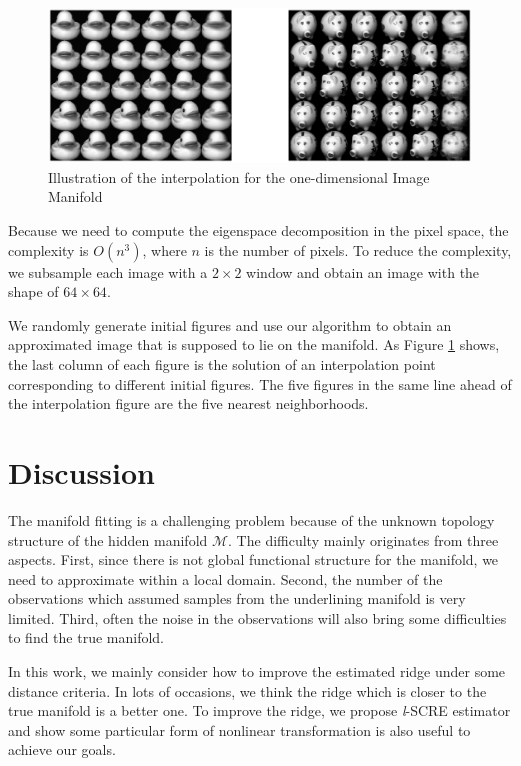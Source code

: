 \documentclass[aos,preprint]{imsart}
\theoremstyle{remark}
\begin{document}
\begin{figure}[h] %
   \includegraphics[width=\linewidth]{duck_pig.eps} 
   \caption{Illustration of the interpolation for the one-dimensional Image Manifold}
   \label{fig:interpolation demo}
\end{figure}

Because we need to compute the eigenspace decomposition in the pixel space, the complexity is $O(n^3)$, where $n$ is the number of pixels. To reduce the complexity, we subsample each image with a $2\times 2$ window and obtain an image with the shape of $64\times 64$.

We randomly generate initial figures and use our algorithm to obtain an approximated image that is supposed to lie on the manifold. As Figure \ref{fig:interpolation demo} shows, the last column of each figure is the solution of an interpolation point corresponding to different initial figures. The five figures in the same line ahead of the interpolation figure are the five nearest neighborhoods.


\section{Discussion}
The manifold fitting is a challenging problem because of the unknown topology structure of the hidden manifold $\mathcal M$. The difficulty mainly originates from three aspects. First, since there is not global functional structure for the manifold,  we need to approximate within a local domain. Second, the number of the observations which assumed samples from the underlining manifold is very limited. Third, often the noise in the observations will also bring some difficulties to find the true manifold.

In this work, we mainly consider how to improve the estimated ridge under some distance criteria. In lots of occasions, we think the ridge which is closer to the true manifold is a better one. To improve the ridge, we propose {\it l}-SCRE estimator and show some particular form of nonlinear transformation is also useful to achieve our goals.
\end{document}
